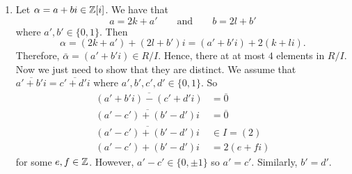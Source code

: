 \begin{solution}
    \begin{enumerate}
        \item Let $\alpha = a + bi \in \mathbb{Z}[i]$.
            We have that 
            \[ a = 2k + a' \qquad \text{and} \qquad b = 2l + b' \]
            where $a', b' \in \{0, 1\}$.
            Then
            \[ \alpha = 
                (2k + a') + (2l + b')i = 
                (a' + b'i) + 2(k + li). \]
            Therefore, $\bar \alpha = (a' + b'i) \in R/I$.
            Hence, there at at most $4$ elements in $R / I$.
            Now we just need to show that they are distinct. 
            We assume that 
            $\overline{a' + b'i} = \overline{c' + d'i}$
            where $a', b', c', d' \in \{0,1\}$.
            So 
            \begin{align*}
                \overline{(a' + b'i) - (c' + d'i)} &=   \overline 0 \\
                \overline{(a' - c') + (b' - d')i}  &=   \overline 0 \\
                \overline{(a' - c') + (b' - d')i}  &\in I = (2)     \\
                (a' - c') + (b' - d')i             &= 2(e + fi)
            \end{align*}
            for some $e, f \in \mathbb{Z}$.
            However, 
            $a' - c' \in \{0, \pm 1\}$
            so $a' = c'$.
            Similarly,
            $b' = d'$.


\end{enumerate}
\end{solution}
